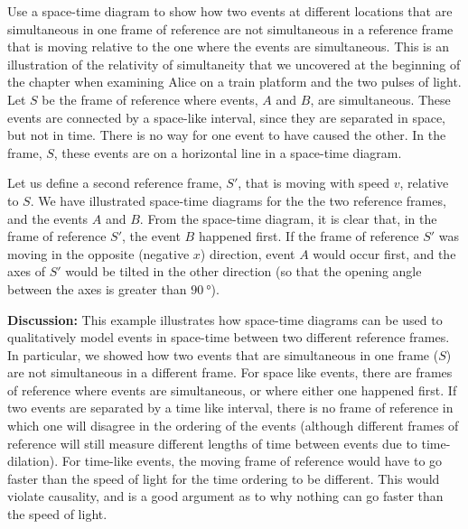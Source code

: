 \begin{example}{Use a space-time diagram to show how two events at different locations that are simultaneous in one frame of reference are not simultaneous in a reference frame that is moving relative to the one where the events are simultaneous. This is an illustration of the relativity of simultaneity that we uncovered at the beginning of the chapter when examining Alice on a train platform and the two pulses of light.}
Let $S$ be the frame of reference where events, $A$ and $B$, are simultaneous. These events are connected by a space-like interval, since they are separated in space, but not in time. There is no way for one event to have caused the other. In the frame, $S$, these events are on a horizontal line in a space-time diagram.

Let us define a second reference frame, $S'$, that is moving with speed $v$, relative to $S$. We have illustrated space-time diagrams for the the two reference frames, and the events $A$ and $B$.
From the space-time diagram, it is clear that, in the frame of reference $S'$, the event $B$ happened first. If the frame of reference $S'$ was moving in the opposite (negative $x$) direction, event $A$ would occur first, and the axes of $S'$ would be tilted in the other direction (so that the opening angle between the axes is greater than $\SI{90}{\degree}$).

\textbf{Discussion: }This example illustrates how space-time diagrams can be used to qualitatively model events in space-time between two different reference frames. In particular, we showed how two events that are simultaneous in one frame ($S$) are not simultaneous in a different frame. For space like events, there are frames of reference where events are simultaneous, or where either one happened first. If two events are separated by a time like interval, there is no frame of reference in which one will disagree in the ordering of the events (although different frames of reference will still measure different lengths of time between events due to time-dilation). For time-like events, the moving frame of reference would have to go faster than the speed of light for the time ordering to be different. This would violate causality, and is a good argument as to why nothing can go faster than the speed of light.
\end{example}

